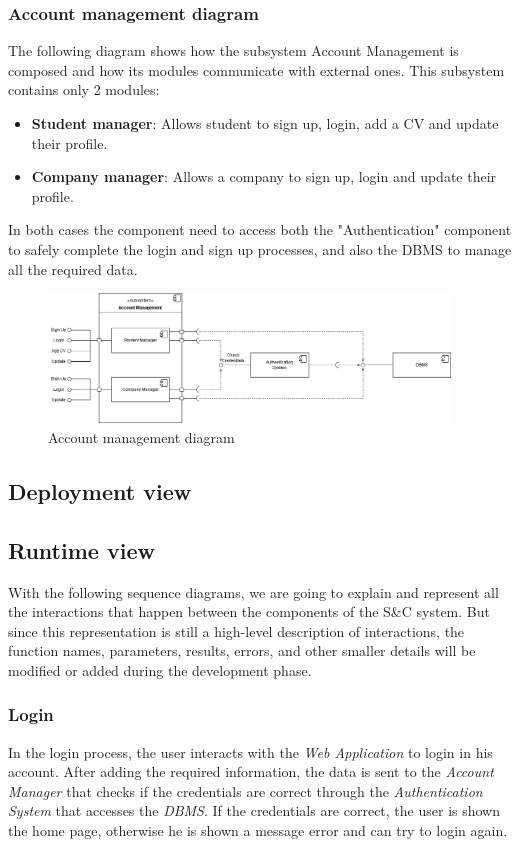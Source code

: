 \documentclass[11pt,twoside]{article}
\begin{document}
		\subsubsection{Account management diagram}
The following diagram shows how the subsystem Account Management is composed and how its modules communicate with external ones. This subsystem contains only 2 modules:
\begin{itemize}
\item \textbf{Student manager}: Allows student to sign up, login, add a CV and update their profile.
\item \textbf{Company manager}: Allows a company to sign up, login and update their profile.
\end{itemize}
In both cases the component need to access both the "Authentication" component to safely complete the login and sign up processes, and also the DBMS to manage all the required data.

\begin{figure}[H]
\centering
\includegraphics[width=0.95\textwidth]{Images/Component3}
\caption{Account management diagram}\label{Component3}
\end{figure}

\newpage

	\subsection{Deployment view}
 
	\subsection{Runtime view}
With the following sequence diagrams, we are going to explain and represent all the interactions that happen between the components of the S\&C system. But since this representation is still a high-level description of interactions, the function names, parameters, results, errors, and other smaller details will be modified or added during the development phase.

		\subsubsection{Login}
In the login process, the user interacts with the \textit{Web Application} to login in his account. After adding the required information, the data is sent to the \textit{Account Manager} that checks if the credentials are correct through the \textit{Authentication System} that accesses the \textit{DBMS}. If the credentials are correct, the user is shown the home page, otherwise he is shown a message error and can try to login again.
\end{document}
